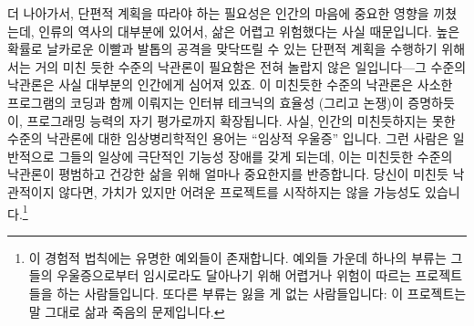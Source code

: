 더 나아가서, 단편적 계획을 따라야 하는 필요성은 인간의 마음에 중요한 영향을
끼쳤는데, 인류의 역사의 대부분에 있어서, 삶은 어렵고 위험했다는 사실
때문입니다.
높은 확률로 날카로운 이빨과 발톱의 공격을 맞닥뜨릴 수 있는 단편적 계획을
수행하기 위해서는 거의 미친 듯한 수준의 낙관론이 필요함은 전혀 놀랍지 않은
일입니다---그 수준의 낙관론은 사실 대부분의 인간에게 심어져 있죠.
이 미친듯한 수준의 낙관론은 사소한 프로그램의 코딩과 함께 이뤄지는 인터뷰
테크닉의 효율성 (그리고 논쟁)이 증명하듯이, 프로그래밍 능력의 자기 평가로까지
확장됩니다.
사실, 인간의 미친듯하지는 못한 수준의 낙관론에 대한 임상병리학적인 용어는
``임상적 우울증'' 입니다.  그런 사람은 일반적으로 그들의 일상에 극단적인 기능성
장애를 갖게 되는데, 이는 미친듯한 수준의 낙관론이 평범하고 건강한 삶을 위해
얼마나 중요한지를 반증합니다.
당신이 미친듯 낙관적이지 않다면, 가치가 있지만 어려운 프로젝트를 시작하지는
않을 가능성도 있습니다.\footnote{
	이 경험적 법칙에는 유명한 예외들이 존재합니다.
	예외들 가운데 하나의 부류는 그들의 우울증으로부터 임시로라도 달아나기
	위해 어렵거나 위험이 따르는 프로젝트들을 하는 사람들입니다.
	또다른 부류는 잃을 게 없는 사람들입니다: 이 프로젝트는 말 그대로 삶과
	죽음의 문제입니다.}

